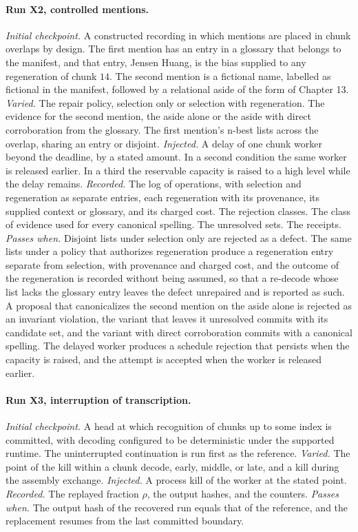 \documentclass[11pt,openany]{book}
\theoremstyle{remark}
\begin{document}
\paragraph{Run X2, controlled mentions.} \emph{Initial checkpoint.} A constructed recording in which mentions are placed in chunk overlaps by design. The first mention has an entry in a glossary that belongs to the manifest, and that entry, Jensen Huang, is the bias supplied to any regeneration of chunk $14$. The second mention is a fictional name, labelled as fictional in the manifest, followed by a relational aside of the form of Chapter 13. \emph{Varied.} The repair policy, selection only or selection with regeneration. The evidence for the second mention, the aside alone or the aside with direct corroboration from the glossary. The first mention's n-best lists across the overlap, sharing an entry or disjoint. \emph{Injected.} A delay of one chunk worker beyond the deadline, by a stated amount. In a second condition the same worker is released earlier. In a third the reservable capacity is raised to a high level while the delay remains. \emph{Recorded.} The log of operations, with selection and regeneration as separate entries, each regeneration with its provenance, its supplied context or glossary, and its charged cost. The rejection classes. The class of evidence used for every canonical spelling. The unresolved sets. The receipts. \emph{Passes when.} Disjoint lists under selection only are rejected as a defect. The same lists under a policy that authorizes regeneration produce a regeneration entry separate from selection, with provenance and charged cost, and the outcome of the regeneration is recorded without being assumed, so that a re-decode whose list lacks the glossary entry leaves the defect unrepaired and is reported as such. A proposal that canonicalizes the second mention on the aside alone is rejected as an invariant violation, the variant that leaves it unresolved commits with its candidate set, and the variant with direct corroboration commits with a canonical spelling. The delayed worker produces a schedule rejection that persists when the capacity is raised, and the attempt is accepted when the worker is released earlier.

\paragraph{Run X3, interruption of transcription.} \emph{Initial checkpoint.} A head at which recognition of chunks up to some index is committed, with decoding configured to be deterministic under the supported runtime. The uninterrupted continuation is run first as the reference. \emph{Varied.} The point of the kill within a chunk decode, early, middle, or late, and a kill during the assembly exchange. \emph{Injected.} A process kill of the worker at the stated point. \emph{Recorded.} The replayed fraction $\rho$, the output hashes, and the counters. \emph{Passes when.} The output hash of the recovered run equals that of the reference, and the replacement resumes from the last committed boundary.
\end{document}
